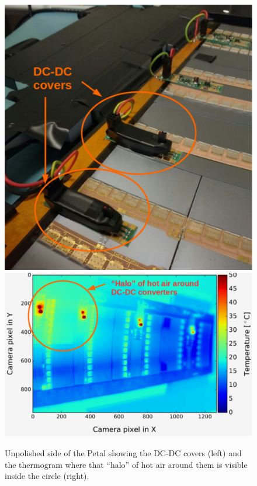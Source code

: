 		\begin{figure}[ht!]
			\centering
			\captionsetup{justification=centering,margin=2cm}
			\includegraphics[scale=0.33]{Figures/Chapter02/DCDC_covers.pdf}
			\includegraphics[scale=0.46]{Figures/Chapter02/HaloThermogram.pdf}
			\caption{Unpolished side of the Petal showing the DC-DC covers (left) and the thermogram where that “halo” of hot air around them is visible inside the circle (right).}\label{fig2.8}
		\end{figure}
	
